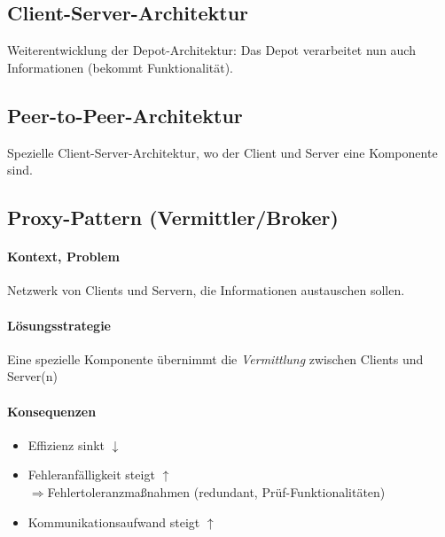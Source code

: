 \documentclass{scrreprt}
\begin{document}
\subsection{Client-Server-Architektur}
Weiterentwicklung der Depot-Architektur: Das Depot verarbeitet nun auch Informationen (bekommt Funktionalität).

\subsection{Peer-to-Peer-Architektur}
Spezielle Client-Server-Architektur, wo der Client und Server eine Komponente sind.

\subsection{Proxy-Pattern (Vermittler/Broker)}
\paragraph{Kontext, Problem} Netzwerk von Clients und Servern, die Informationen austauschen sollen.
\paragraph{Lösungsstrategie} Eine spezielle Komponente übernimmt die \emph{Vermittlung} zwischen Clients und Server(n)
\paragraph{Konsequenzen}
\begin{itemize}
\item Effizienz sinkt $\downarrow$
\item Fehleranfälligkeit steigt $\uparrow$\\
$\Rightarrow$Fehlertoleranzmaßnahmen (redundant, Prüf-Funktionalitäten)
\item Kommunikationsaufwand steigt $\uparrow$
\end{itemize}
\begin{center}
\end{center}
\end{document}
